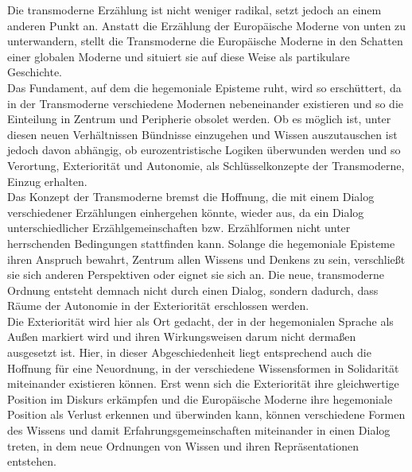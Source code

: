 Die transmoderne Erzählung ist nicht weniger radikal, setzt jedoch an einem
anderen Punkt an. Anstatt die Erzählung der Europäische Moderne von unten zu
unterwandern, stellt die Transmoderne die Europäische Moderne in den Schatten
einer globalen Moderne und situiert sie auf diese Weise als partikulare
Geschichte. \\
Das Fundament, auf dem die hegemoniale Episteme ruht, wird so
erschüttert, da in der Transmoderne verschiedene Modernen nebeneinander
existieren und so die Einteilung in Zentrum und Peripherie obsolet werden. Ob es
möglich ist, unter diesen neuen Verhältnissen Bündnisse einzugehen und Wissen
auszutauschen ist jedoch davon abhängig, ob eurozentristische Logiken überwunden
werden und so Verortung, Exteriorität und Autonomie, als Schlüsselkonzepte der
Transmoderne, Einzug erhalten. \\
Das Konzept der Transmoderne bremst die Hoffnung,
die mit einem Dialog verschiedener Erzählungen einhergehen könnte, wieder aus,
da ein Dialog unterschiedlicher Erzählgemeinschaften bzw. Erzählformen nicht
unter herrschenden Bedingungen stattfinden kann. Solange die hegemoniale
Episteme ihren Anspruch bewahrt, Zentrum allen Wissens und Denkens zu sein,
verschließt sie sich anderen Perspektiven oder eignet sie sich an. Die neue,
transmoderne Ordnung entsteht demnach nicht durch einen Dialog, sondern dadurch,
dass Räume der Autonomie in der Exteriorität erschlossen werden. \\
Die
Exteriorität wird hier als Ort gedacht, der in der hegemonialen Sprache als
Außen markiert wird und ihren Wirkungsweisen darum nicht dermaßen ausgesetzt
ist. Hier, in dieser Abgeschiedenheit liegt entsprechend auch die Hoffnung für
eine Neuordnung, in der verschiedene Wissensformen in Solidarität miteinander
existieren können. Erst wenn sich die Exteriorität ihre gleichwertige Position
im Diskurs erkämpfen und die Europäische Moderne ihre hegemoniale Position  als
Verlust erkennen und überwinden kann, können verschiedene Formen des Wissens und
damit Erfahrungsgemeinschaften miteinander in einen Dialog treten, in dem neue
Ordnungen von Wissen und ihren Repräsentationen entstehen. 
\\

